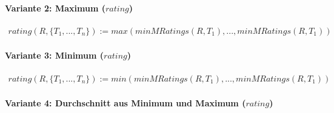 \paragraph{Variante 2: Maximum ($\mathit{rating}$)}

\begin{gather*}
\mathit{rating(R,\{T_1,...,T_n\})} := \mathit{max(minMRatings(R,T_1),...,minMRatings(R,T_1))}
\end{gather*}

\paragraph{Variante 3: Minimum ($\mathit{rating}$)}

\begin{gather*}
\mathit{rating(R,\{T_1,...,T_n\})} := \mathit{min(minMRatings(R,T_1),...,minMRatings(R,T_1))}\end{gather*}

\paragraph{Variante 4: Durchschnitt aus Minimum und Maximum ($\mathit{rating}$)}

